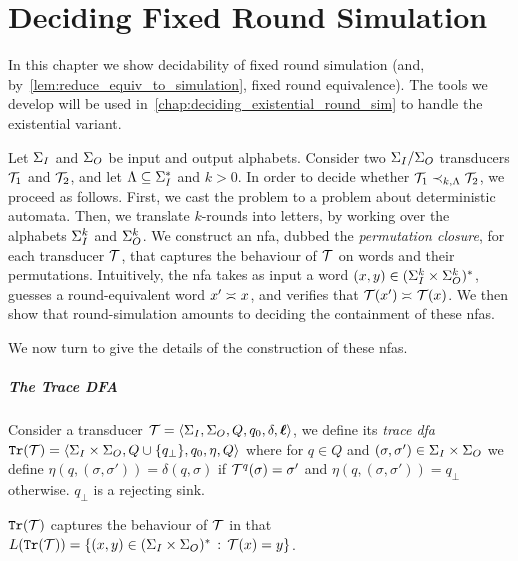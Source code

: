 \chapter{Deciding Fixed Round Simulation}
\label{chap:deciding_fixed_round_sim}

In this chapter we show decidability of fixed round simulation (and, by~\cref{lem:reduce_equiv_to_simulation}, fixed round equivalence). The tools we develop will be used in~\cref{chap:deciding_existential_round_sim} to handle the existential variant.

Let $\Sigma_{I}$ and $\Sigma_{O}$ be input and output alphabets. Consider two $\Sigma_{I}/\Sigma_{O}$ transducers $\mathcal{T}_1$ and $\mathcal{T}_2$, and let $\Lambda\subseteq \Sigma_{I}^*$ and $k>0$.
In order to decide whether $\mathcal{T}_1\prec_{k,\Lambda} \mathcal{T}_2$, we proceed as follows. First, we cast the problem to a problem about deterministic automata. Then, we translate $k$-rounds into letters, by working over the alphabets $\Sigma_{I}^k$ and $\Sigma_{O}^k$. We construct an \gls{nfa}, dubbed the \emph{permutation closure}, for each transducer $\mathcal{T}$, that captures the behaviour of $\mathcal{T}$ on words and their permutations. Intuitively, the \gls{nfa} takes as input a word $(x,y)\in (\Sigma_{I}^{k}\times \Sigma_{O}^k)^*$, guesses a round-equivalent word $x'\asymp_{} x$, and verifies that $\mathcal{T}(x')\asymp_{} \mathcal{T}(x)$. We then show that round-simulation amounts to deciding the containment of these \glspl{nfa}.

We now turn to give the details of the construction of these \glspl{nfa}.

\paragraph{The Trace \bf DFA} Consider a transducer $\mathcal{T}=\left< \Sigma_{I},\Sigma_{O},Q,q_0,\delta,\boldsymbol{\ell}\right>$, we define its \emph{trace \gls{dfa}} ${\mathtt{Tr}}(\mathcal{T})=\left< \Sigma_{I}\times\Sigma_{O},Q\cup\{q_{\bot}\},q_0,\eta,Q\right>$ where for $q\in Q$ and $(\sigma,\sigma')\in \Sigma_{I}\times \Sigma_{O}$ we define $\eta(q,(\sigma,\sigma'))=\delta(q,\sigma)$ if $\mathcal{T}^{q}(\sigma)=\sigma'$ and $\eta(q,(\sigma,\sigma'))=q_{\bot}$ otherwise.
$q_\bot$ is a rejecting sink. 

${\mathtt{Tr}}(\mathcal{T})$ captures the behaviour of $\mathcal{T}$ in that $L({\mathtt{Tr}}(\mathcal{T}))=\{(x,y)\in (\Sigma_{I}\times \Sigma_{O})^*\, :\, \mathcal{T}(x)=y\}$. 

